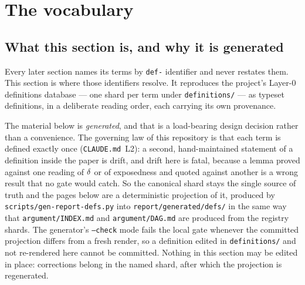 \section{The vocabulary}\label{sec:definitions}

\subsection*{What this section is, and why it is generated}

Every later section names its terms by \texttt{def-} identifier and never restates them.
This section is where those identifiers resolve. It reproduces the project's Layer-0
definitions database --- one shard per term under \texttt{definitions/} --- as typeset
definitions, in a deliberate reading order, each carrying its own provenance.

The material below is \emph{generated}, and that is a load-bearing design decision rather
than a convenience. The governing law of this repository is that each term is defined
exactly once (\texttt{CLAUDE.md}~L2): a second, hand-maintained statement of a definition
inside the paper is drift, and drift here is fatal, because a lemma proved against one
reading of $\delta$ or of exposedness and quoted against another is a wrong result that
no gate would catch. So the canonical shard stays the single source of truth and the pages
below are a deterministic projection of it, produced by
\texttt{scripts/gen-report-defs.py} into \texttt{report/generated/defs/} in the same way
that \texttt{argument/INDEX.md} and \texttt{argument/DAG.md} are produced from the registry
shards. The generator's \texttt{--check} mode fails the local gate whenever the committed
projection differs from a fresh render, so a definition edited in \texttt{definitions/} and
not re-rendered here cannot be committed. Nothing in this section may be edited in place:
corrections belong in the named shard, after which the projection is regenerated.

